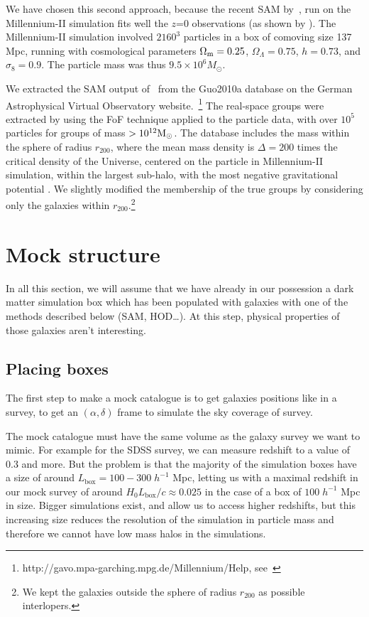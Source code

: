 We have chosen this second approach, because the recent SAM by~\cite{Guo+11},
run on the Millennium-II simulation \citep{BoylanKolchin+09} fits well the
$z$=0 observations (as shown by \citeauthor{Guo+11}). The Millennium-II
simulation  involved $2160^3$ particles in a box of comoving size 137 Mpc,
running with cosmological parameters $\Omega_{\rm m}=0.25$,
$\Omega_\Lambda=0.75$, $h=0.73$, and $\sigma_8=0.9$. The particle mass was thus
$9.5\times 10^6 M_\odot$.

We extracted the SAM output of~\cite{Guo+11} from the Guo2010a database on the
German Astrophysical Virtual Observatory
website.~\footnote{http://gavo.mpa-garching.mpg.de/Millennium/Help,
see~\cite{Lemson06}} The real-space groups were extracted by
\citeauthor{Guo+11} using the FoF technique applied to the particle data, with
over $10^5$ particles for groups of mass $>10^{12} \rm M_\odot$. The database
includes the mass within the sphere of radius $r_{200}$, where the mean mass
density is $\Delta=200$ times the critical density of the Universe, centered on
the particle in Millennium-II simulation, within the largest sub-halo, with the
most negative gravitational potential \citep{BoylanKolchin+09}. We slightly
modified the membership of the true groups by considering only the galaxies
within $r_{200}$.\footnote{We kept the galaxies outside the sphere of radius
$r_{200}$ as possible interlopers.}

\section{Mock structure}

In all this section, we will assume that we have already in our possession a
dark matter simulation box which has been populated with galaxies with one of
the methods described below (SAM, HOD\ldots). At this step, physical properties
of those galaxies aren't interesting.

\subsection{Placing boxes}

The first step to make a mock catalogue is to get galaxies positions like in a
survey, to get an $(\alpha,\delta)$ frame to simulate the sky coverage of
survey.

The mock catalogue must have the same volume as the galaxy survey we want to
mimic. For example for the SDSS survey, we can measure redshift to a value of
0.3 and more. But the problem is that the majority of the simulation boxes have
a size of around $L_{\mathrm{box}}=100-300\; h^{-1}$ Mpc, letting us with a
maximal redshift in our mock survey of around ${H_0}{L_{\mathrm{box}}}/c\approx
0.025$ in the case of a box of $100\; h^{-1}$ Mpc in size. Bigger simulations
exist, and allow us to access higher redshifts, but this increasing size
reduces the resolution of the simulation in particle mass and therefore we
cannot have low mass halos in the simulations.

